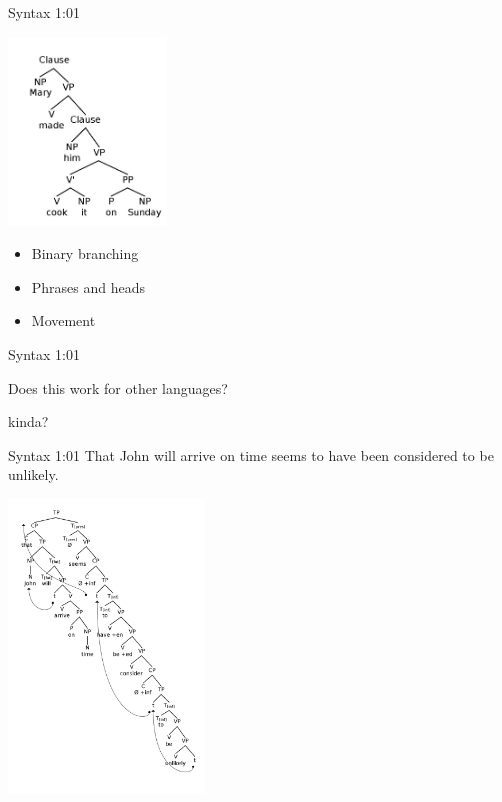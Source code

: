 \documentclass[10pt]{beamer}
\begin{document}
\begin{frame}[fragile]{Syntax 1:01}
  \centerline{\includegraphics[height=5cm]{marymadehimcookitonsunday.png}} \pause
  \begin{itemize}[<+->]
    \item Binary branching
    \item Phrases and heads
    \item Movement
  \end{itemize}
\end{frame}

\begin{frame}[fragile]{Syntax 1:01}
  
  Does this work for other languages? \pause

  \alert{kinda?}
  
\end{frame}


\begin{frame}[fragile]{Syntax 1:01}
  That John will arrive on time seems to have been considered to be unlikely.

  \centerline{\includegraphics[height=7.8cm]{thatjohnwillarriveontimeseemstohavebeenconsideredtobeunlikely.jpg} }
\end{frame}
\end{document}
